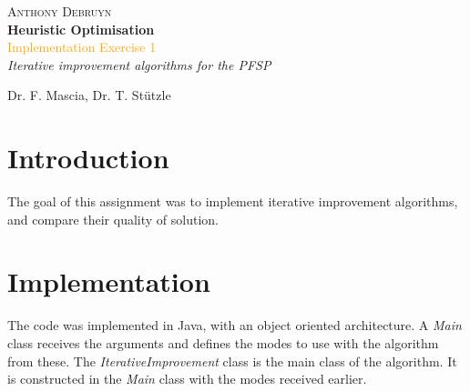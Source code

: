\newcommand*{\titleTH}{\begingroup %
\raggedleft %
\vspace*{\baselineskip} %

{\Large \textsc{Anthony Debruyn}}\\[0.167\textheight] %

{\LARGE\bfseries Heuristic Optimisation}\\[\baselineskip] %

{\textcolor{Orange}{\Huge Implementation Exercise 1}}\\[\baselineskip] %

{\Large \textit{Iterative improvement algorithms for the PFSP}}\par %

\vfill %


{\large Dr. F. Mascia, Dr. T. Stützle \course}\par %

\endgroup}


 

\thispagestyle{empty}

\titleTH %

\newpage

\section{Introduction}
The goal of this assignment was to implement iterative improvement algorithms, and compare their quality of solution. 

\section{Implementation}
The code was implemented in Java, with an object oriented architecture. A \emph{Main} class receives the arguments and defines the modes to use with the algorithm from these. The \emph{IterativeImprovement} class is the main class of the algorithm. It is constructed in the \emph{Main} class with the modes received earlier.\\

